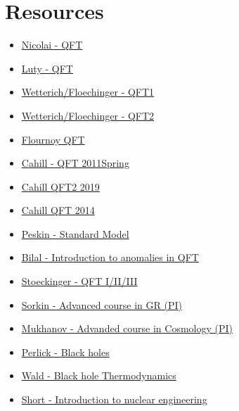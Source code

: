 \documentclass[10pt,a4paper]{book}
\theoremstyle{definition}
\begin{document}
\chapter{Resources}
\begin{itemize}
\item \href{https://www.youtube.com/watch?v=seabT438nr0}{Nicolai - QFT}
\item \href{https://www.youtube.com/watch?v=EzfFklLqDjA&t=791s}{Luty - QFT}
\item \href{https://www.tpi.uni-jena.de/~floerchinger/qft1/Lecture01/}{Wetterich/Floechinger - QFT1}
\item \href{https://www.tpi.uni-jena.de/~floerchinger/qft2/lecture01/}{Wetterich/Floechinger - QFT2}
\item \href{https://www.youtube.com/@AlexFlournoyTeacher}{Flournoy QFT}
\item \href{https://www.youtube.com/watch?v=MqG-F6CV7qk&list=PLB6035BED574535DC}{Cahill - QFT 2011Spring}
\item \href{https://www.youtube.com/watch?v=Z4gC4ezAG0Y&list=PLpyIij4nP6QLfC2CsDF8CHzK6HkEkWCze}{Cahill QFT2 2019}
\item \href{https://www.youtube.com/playlist?list=PLpyIij4nP6QKgoKhAWKHZFHrvkFHsFZym}{Cahill QFT 2014}
\item \href{https://www.youtube.com/watch?v=0LWYXkeuy-Q}{Peskin - Standard Model}
\item \href{https://www.youtube.com/watch?v=Q3cHDiZIG44}{Bilal - Introduction to anomalies in QFT}
\item \href{https://www.youtube.com/@qftdominikstoeckinger1285/playlists}{Stoeckinger - QFT I/II/III}


\item \href{https://www.youtube.com/watch?v=5IDHkKwXK4Y&list=PLaNkJORnlhZlAeFDKvWuoyqBBLPZ0F-3X}{Sorkin - Advanced course in GR (PI)}
\item \href{https://www.youtube.com/watch?v=IPxnAw91bMM&list=PLaNkJORnlhZkrH4w1AXqx4c4KNjJgh2rB}{Mukhanov - Advanded course in Cosmology (PI)}

\item \href{https://www.youtube.com/watch?v=3JhwuqEdyXM&list=PLaNkJORnlhZl6XY824eq9D2x6JoLwwpyr}{Perlick - Black holes}
\item \href{https://www.youtube.com/watch?v=Ssmr057FLEE}{Wald - Black hole Thermodynamics}

\item \href{https://ocw.mit.edu/courses/22-01-introduction-to-nuclear-engineering-and-ionizing-radiation-fall-2016/video_galleries/lecture-videos/}{Short - Introduction to nuclear engineering}


\end{itemize}
\end{document}
